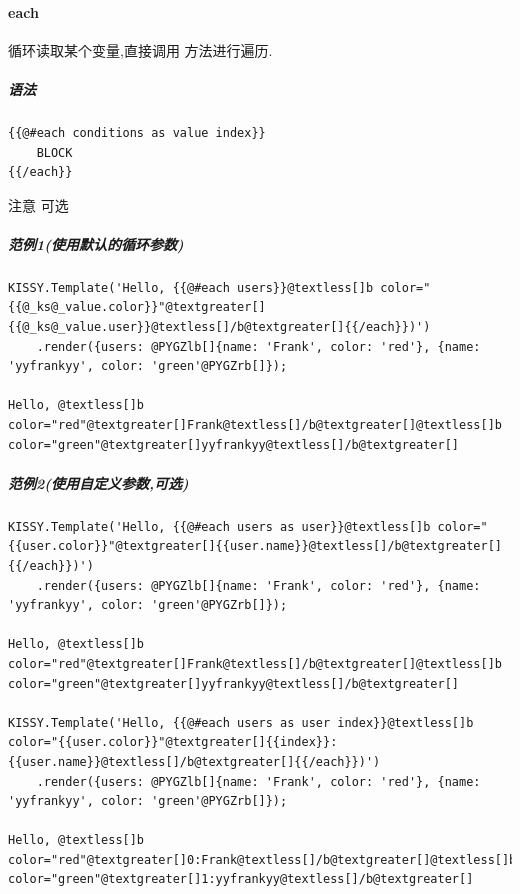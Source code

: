 \documentclass[letterpaper,10pt,english]{sphinxmanual}
\begin{document}
\paragraph{each}
\label{api/component/template/index:each}
循环读取某个变量,直接调用  方法进行遍历.


\subparagraph{语法}
\label{api/component/template/index:id11}
\begin{Verbatim}[commandchars=@\[\]]
{{@#each conditions as value index}}
    BLOCK
{{/each}}
\end{Verbatim}

注意  可选


\subparagraph{范例1(使用默认的循环参数)}
\label{api/component/template/index:id12}
\begin{Verbatim}[commandchars=@\[\]]
KISSY.Template('Hello, {{@#each users}}@textless[]b color="{{@_ks@_value.color}}"@textgreater[]{{@_ks@_value.user}}@textless[]/b@textgreater[]{{/each}})')
    .render({users: @PYGZlb[]{name: 'Frank', color: 'red'}, {name: 'yyfrankyy', color: 'green'@PYGZrb[]});

Hello, @textless[]b color="red"@textgreater[]Frank@textless[]/b@textgreater[]@textless[]b color="green"@textgreater[]yyfrankyy@textless[]/b@textgreater[]
\end{Verbatim}


\subparagraph{范例2(使用自定义参数,可选)}
\label{api/component/template/index:id13}
\begin{Verbatim}[commandchars=@\[\]]
KISSY.Template('Hello, {{@#each users as user}}@textless[]b color="{{user.color}}"@textgreater[]{{user.name}}@textless[]/b@textgreater[]{{/each}})')
    .render({users: @PYGZlb[]{name: 'Frank', color: 'red'}, {name: 'yyfrankyy', color: 'green'@PYGZrb[]});

Hello, @textless[]b color="red"@textgreater[]Frank@textless[]/b@textgreater[]@textless[]b color="green"@textgreater[]yyfrankyy@textless[]/b@textgreater[]

KISSY.Template('Hello, {{@#each users as user index}}@textless[]b color="{{user.color}}"@textgreater[]{{index}}:{{user.name}}@textless[]/b@textgreater[]{{/each}})')
    .render({users: @PYGZlb[]{name: 'Frank', color: 'red'}, {name: 'yyfrankyy', color: 'green'@PYGZrb[]});

Hello, @textless[]b color="red"@textgreater[]0:Frank@textless[]/b@textgreater[]@textless[]b color="green"@textgreater[]1:yyfrankyy@textless[]/b@textgreater[]
\end{Verbatim}
\end{document}
